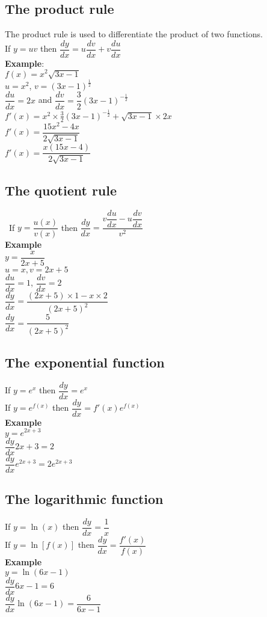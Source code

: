 \documentclass{article}[18pt]
\begin{document}
\subsection{The product rule}
The product rule is used to differentiate the product of two functions.
\\
If $y=uv$ then $\dfrac{dy}{dx}=u\dfrac{dv}{dx}+v\dfrac{du}{dx}$
\\
\textbf{Example}:\\
$f(x)=x^2\sqrt{3x-1}$\\
$u=x^2$, $v=(3x-1)^{\frac{1}{2}}$\\
$\dfrac{du}{dx}=2x$ and $\dfrac{dv}{dx}=\dfrac{3}{2}(3x-1)^{-\frac{1}{2}}$\\
$f'(x)=x^2\times\frac{3}{2}(3x-1)^{-\frac{1}{2}}+\sqrt{3x-1}\times 2x$\\
$f'(x)=\dfrac{15x^2-4x}{2\sqrt{3x-1}}$\\
$f'(x)=\dfrac{x(15x-4)}{2\sqrt{3x-1}}$\\
\subsection{The quotient rule}
\
If $y=\dfrac{u(x)}{v(x)}$ then $\dfrac{dy}{dx}=\dfrac{v\dfrac{du}{dx}-u\dfrac{dv}{dx}}{v^2}$\\
\textbf{Example}\\
$y=\dfrac{x}{2x+5}$\\
$u=x, v=2x+5$\\
$\dfrac{du}{dx}=1$, $\dfrac{dv}{dx}=2$\\
$\dfrac{dy}{dx}=\dfrac{(2x+5)\times1-x\times2}{(2x+5)^2}$\\
$\dfrac{dy}{dx}=\dfrac{5}{(2x+5)^2}$\\
\subsection{The exponential function}
If $y=e^x$ then $\dfrac{dy}{dx}=e^x$\\
If $y=e^{f(x)}$ then $\dfrac{dy}{dx}=f'(x)e^{f(x)}$\\
\textbf{Example}\\
$y=e^{2x+3}$\\
$\dfrac{dy}{dx}2x+3=2$\\
$\dfrac{dy}{dx}e^{2x+3}=2e^{2x+3}$\\
\subsection{The logarithmic function}
If $y=\ln(x)$ then $\dfrac{dy}{dx}=\dfrac{1}{x}$\\
If $y=\ln[f(x)]$ then $\dfrac{dy}{dx}=\dfrac{f'(x)}{f(x)}$\\
\textbf{Example}\\
$y=\ln(6x-1)$\\
$\dfrac{dy}{dx}6x-1=6$\\
$\dfrac{dy}{dx}\ln(6x-1)=\dfrac{6}{6x-1}$
\end{document}
